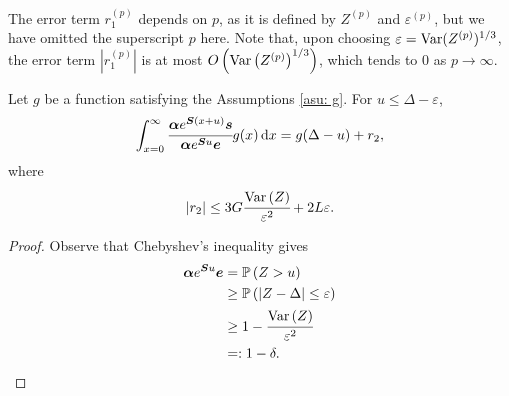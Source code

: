 The error term \(r_1^{(p)}\) depends on \(p\), as it is defined by \(Z^{(p)}\) and \(\varepsilon^{(p)}\), but we have omitted the superscript \(p\) here. Note that, upon choosing \(\varepsilon=\mathrm{Var}(Z^{(p)})^{1/3}\), the error term \(|r_1^{(p)}|\) is at most \(O\left(\mathrm{Var}\left(Z^{(p)}\right)^{1/3}\right)\), which tends to 0 as \(p\to\infty\).

\begin{cor}\label{cor: cond bnd}
	Let \(g\) be a function satisfying the Assumptions \ref{asu: g}. For \(u\leq \Delta-\varepsilon \), 
	\[\int_{x=0}^\infty \cfrac{\boldsymbol \alpha  e^{\boldsymbol{S} (x+u)} \boldsymbol s}{\boldsymbol \alpha  e^{\boldsymbol{S} u} \boldsymbol e} g(x)\, \mathrm{d} x = g(\Delta-u) + r_2 ,\]
	where 
	\[\left|r_2 \right|\leq 3G\cfrac{\mathrm{Var} \left(Z \right)}{\varepsilon ^2} + 2L\varepsilon .\]
\end{cor}
\begin{proof}
	Observe that Chebyshev's inequality gives
	\begin{align*}
		\boldsymbol \alpha e^{\boldsymbol Su}\boldsymbol e&=\mathbb P\left(Z >u\right) 
		\\&\geq \mathbb P\left(|Z -\Delta|\leq \varepsilon \right) 
		\\&\geq 1 - \cfrac{\mathrm{Var}\left(Z \right)}{\varepsilon ^2} 
		\\&=: 1-\delta .
	\end{align*}
	

\end{proof}
